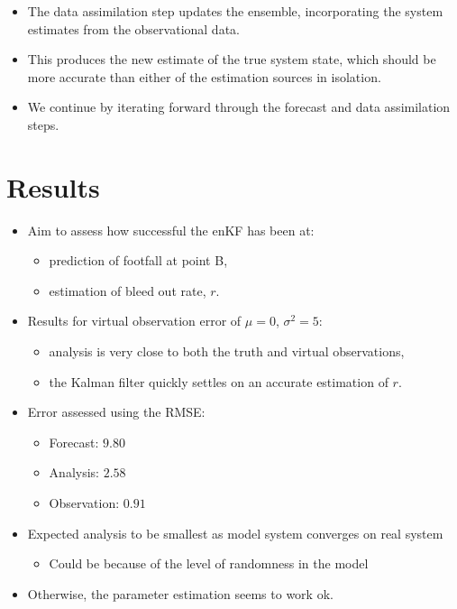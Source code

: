 \begin{itemize}
    \item The data assimilation step updates the ensemble, incorporating the system estimates from the observational data.
    \item This produces the new estimate of the true system state, which should be more accurate than either of the estimation sources in isolation.
    \item We continue by iterating forward through the forecast and data assimilation steps.
\end{itemize}

\section{Results}
\label{malleson:results}

\begin{itemize}
    \item Aim to assess how successful the enKF has been at:
    \begin{itemize}
        \item prediction of footfall at point B,
        \item estimation of bleed out rate, $r$.
    \end{itemize}
    \item Results for virtual observation error of $\mu=0$, $\sigma^2 = 5$:
    \begin{itemize}
        \item analysis is very close to both the truth and virtual observations,
        \item the Kalman filter quickly settles on an accurate estimation of $r$.
    \end{itemize}
    \item Error assessed using the RMSE:
    \begin{itemize}
        \item Forecast: $9.80$
        \item Analysis: $2.58$
        \item Observation: $0.91$
    \end{itemize}
    \item Expected analysis to be smallest as model system converges on real system
    \begin{itemize}
        \item Could be because of the level of randomness in the model
    \end{itemize}
    \item Otherwise, the parameter estimation seems to work ok.
\end{itemize}

